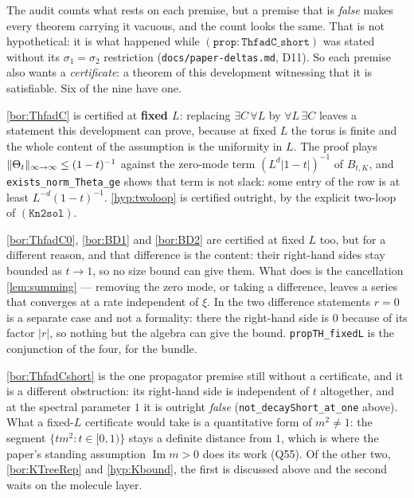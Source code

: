 \begin{lemma}\label{lem:certificates}
  \leanok
  The audit counts what rests on each premise, but a premise that is \emph{false} makes
  every theorem carrying it vacuous, and the count looks the same.  That is not
  hypothetical: it is what happened while $\mathtt{(prop{:}ThfadC\_short)}$ was stated
  without its $\sigma_1=\sigma_2$ restriction (\texttt{docs/paper-deltas.md}, D11).  So
  each premise also wants a \emph{certificate}: a theorem of this development witnessing
  that it is satisfiable.  Six of the nine have one.

  \ref{bor:ThfadC} is certified at \textbf{fixed $L$}: replacing
  $\exists C\,\forall L$ by $\forall L\,\exists C$ leaves a statement this development can
  prove, because at fixed $L$ the torus is finite and the whole content of the assumption
  is the uniformity in $L$.  The proof plays $\|\Theta_t\|_{\infty\to\infty}\le(1-t)^{-1}$
  against the zero-mode term $(L^d|1-t|)^{-1}$ of $B_{t,K}$, and
  \texttt{exists\_norm\_Theta\_ge} shows that term is not slack: some entry of the row is
  at least $L^{-d}(1-t)^{-1}$.  \ref{hyp:twoloop} is certified outright, by the explicit
  two-loop of $\mathtt{(Kn2sol)}$.

  \ref{bor:ThfadC0}, \ref{bor:BD1} and \ref{bor:BD2} are certified at fixed $L$ too, but
  for a different reason, and that difference is the content: their right-hand sides stay
  bounded as $t\to1$, so no size bound can give them.  What does is the cancellation
  \ref{lem:summing} --- removing the zero mode, or taking a difference, leaves a series
  that converges at a rate independent of $\xi$.  In the two difference statements
  $r=0$ is a separate case and not a formality: there the right-hand side is $0$ because
  of its factor $|r|$, so nothing but the algebra can give the bound.
  \texttt{propTH\_fixedL} is the conjunction of the four, for the bundle.

  \ref{bor:ThfadCshort} is the one propagator premise still without a certificate, and it
  is a different obstruction: its right-hand side is independent of $t$ altogether, and at
  the spectral parameter $1$ it is outright \emph{false} (\texttt{not\_decayShort\_at\_one}
  above).  What a fixed-$L$ certificate would take is a quantitative form of $m^2\ne1$: the
  segment $\{tm^2:t\in[0,1)\}$ stays a definite distance from $1$, which is where the
  paper's standing assumption $\operatorname{Im}m>0$ does its work (Q55).  Of the other
  two, \ref{bor:KTreeRep} and \ref{hyp:Kbound}, the first is discussed above and the
  second waits on the molecule layer.
\end{lemma}

